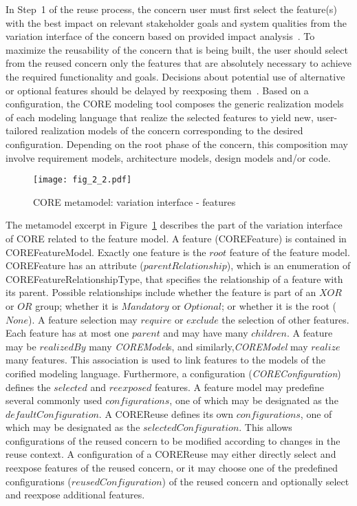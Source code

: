 In Step~1 of the reuse process, the concern user must first select the feature(s) with the best impact on relevant stakeholder goals and system qualities from the variation interface of the concern based on provided impact analysis~\cite{duran2016investigation}. To maximize the reusability of the concern that is being built, the user should select from the reused concern only the features that are absolutely necessary to achieve the required functionality and goals. Decisions about potential use of alternative or optional features should be delayed by reexposing them~\cite{kienzle2016delaying}. Based on a configuration, the CORE modeling tool composes the generic realization models of each modeling language that realize the selected features to yield new, user-tailored realization models of the concern corresponding to the desired configuration. Depending on the root phase of the concern, this composition may involve requirement models, architecture models, design models and/or code.

\begin{figure}
	\centering
	\texttt{[image: fig\_2\_2.pdf]}
	\caption{CORE metamodel: variation interface - features}
	\label{fig:2.2}
\end{figure}

The metamodel excerpt in Figure~\ref{fig:2.2} describes the part of the variation interface of CORE related to the feature model. A feature ({\cls COREFeature}) is contained in {\cls COREFeatureModel}. Exactly one feature is the $root$ feature of the feature model. {\cls COREFeature} has an attribute ($parentRelationship$), which is an enumeration of {\cls COREFeatureRelationshipType}, that specifies the relationship of a feature with its parent. Possible relationships include whether the feature is part of an $XOR$ or $OR$ group; whether it is $Mandatory$ or $Optional$; or whether it is the root ($None$). A feature selection may $require$ or $exclude$ the selection of other features. Each feature has at most one $parent$ and may have many $children$. A feature may be $realizedBy$ many \textit{\cls COREModel}s, and similarly,\textit{\cls COREModel} may $realize$ many features. This association is used to link features to the models of the corified modeling language. Furthermore, a configuration (\textit{\cls COREConfiguration}) defines the $selected$ and $reexposed$ features. A feature model may predefine several commonly used $configurations$, one of which may be designated as the $defaultConfiguration$. A {\cls COREReuse} defines its own $configurations$, one of which may be designated as the $selectedConfiguration$. This allows configurations of the reused concern to be modified according to changes in the reuse context. A configuration of a {\cls COREReuse} may either directly select and reexpose features of the reused concern, or it may choose one of the predefined configurations ($reusedConfiguration$) of the reused concern and optionally select and reexpose additional features.

